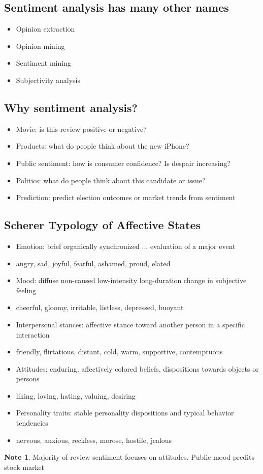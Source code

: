 \documentclass[11pt]{article}
\theoremstyle{definition}
\newtheorem{note}{Note}
\begin{document}
\subsection{Sentiment analysis has many other names}
\begin{itemize}
  \item Opinion extraction
  \item Opinion mining
  \item Sentiment mining
  \item Subjectivity analysis
\end{itemize}

\subsection{Why sentiment analysis?}
\begin{itemize}
  \item Movie: is this review positive or negative?
  \item Products: what do people think about the new iPhone?
  \item Public sentiment: how is consumer confidence? Is despair
  increasing?
  \item Politics: what do people think about this candidate or issue?
  \item Prediction: predict election outcomes or market trends from
  sentiment
\end{itemize}

\subsection{Scherer Typology of Affective States}
\begin{itemize}
  \item Emotion: brief organically synchronized ... evaluation of a major event
  \item angry, sad, joyful, fearful, ashamed, proud, elated
  \item Mood: diffuse non-caused low-intensity long-duration change in subjective feeling
  \item cheerful, gloomy, irritable, listless, depressed, buoyant
  \item Interpersonal stances: affective stance toward another person in a specific interaction
  \item friendly, flirtatious, distant, cold, warm, supportive, contemptuous
  \item Attitudes: enduring, affectively colored beliefs, dispositions towards objects or persons
  \item liking, loving, hating, valuing, desiring
  \item Personality traits: stable personality dispositions and typical behavior tendencies
  \item nervous, anxious, reckless, morose, hostile, jealous
\end{itemize}
\begin{note}
  Majority of review sentiment focuses on attitudes. Public mood predits stock market
\end{note}
\end{document}
